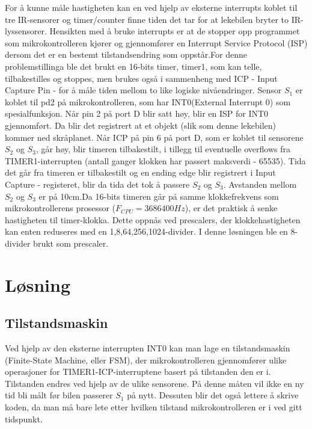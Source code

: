 \documentclass[11pt, a4paper]{report}
\begin{document}
For å kunne måle hastigheten kan en ved hjelp av eksterne interrupts koblet til tre IR-sensorer og timer/counter finne tiden det tar for at lekebilen bryter to IR-lyssensorer.
Hensikten med å bruke interrupts er at de stopper opp programmet som mikrokontrolleren kjører og gjennomfører en Interrupt Service Protocol (ISP) dersom det er en bestemt tilstandsendring som oppstår.\newline For denne problemstillinga ble det brukt en 16-bits timer, timer1, som kan telle, tilbakestilles og stoppes, men brukes også i sammenheng med ICP - Input Capture Pin - for å måle tiden mellom to like logiske nivåendringer. 
Sensor $S_{1}$ er koblet til pd2 på mikrokontrolleren, som har INT0(External Interrupt 0) som spesialfunksjon. Når pin 2 på port D blir satt høy, blir en ISP for INT0 gjennomført. Da blir det registrert at et objekt (slik som denne lekebilen) kommer ned skråplanet. Når ICP på pin 6 på port D, som er koblet til sensorene $S_{2}$ og $S_{3}$, går høy, blir timeren tilbakestilt, i tillegg til eventuelle overflows fra TIMER1-interrupten (antall ganger klokken har passert maksverdi - 65535). Tida det går fra timeren er tilbakestilt og en ending edge blir registrert i Input Capture - registeret, blir da tida det tok å passere $S_{2}$ og $S_{3}$. Avstanden mellom $S_{2}$ og $S_{3}$ er på 10cm.\newline Da 16-bits timeren går på samme klokkefrekvens som mikrokontrollerens prosessor ($F_{CPU} = 3686400 Hz$), er det praktisk å senke hastigheten til timer-klokka. Dette oppnås ved prescalers, der klokkehastigheten kan enten reduseres med en 1,8,64,256,1024-divider. I denne løsningen ble en 8-divider brukt som prescaler.


\section{Løsning}
\subsection{Tilstandsmaskin}
Ved hjelp av den eksterne interrupten INT0 kan man lage en tilstandsmaskin (Finite-State Machine, eller FSM), der mikrokontrolleren gjennomfører ulike operasjoner for TIMER1-ICP-interruptene basert på tilstanden den er i. Tilstanden endres ved hjelp av de ulike sensorene. På denne måten vil ikke en ny tid bli målt før bilen passerer $S_{1}$ på nytt. Dessuten blir det også lettere å skrive koden, da man må bare lete etter hvilken tilstand mikrokontrolleren er i ved gitt tidspunkt. 
\end{document}
